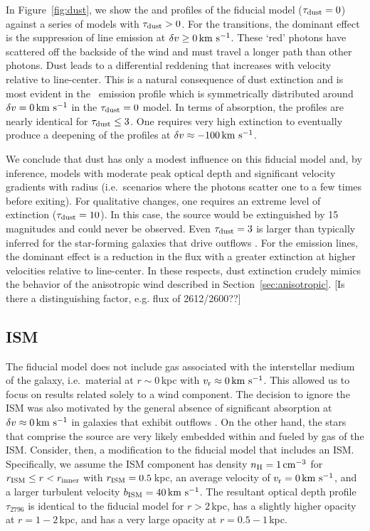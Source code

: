 \documentclass[12pt,preprint]{aastex}
\begin{document}
In Figure~\ref{fig:dust}, we show the  and 
profiles of the fiducial model ($\tau_{\rm dust} = 0$) against a series of
models with $\tau_{\rm dust} > 0$.  For the  transitions, the
dominant effect is the suppression of line emission at $\delta v \ge 0
\, {\rm km~s^{-1}}$.  These `red' photons have scattered off the
backside of the wind and must travel a longer path than other
photons.  Dust leads to a differential reddening that increases with 
velocity relative to line-center. This is a natural consequence of dust
extinction and is most evident in the \feiic\ 
emission profile which is symmetrically distributed around
$\delta v= 0 \, {\rm km~s^{-1}}$ in the $\tau_{\rm dust}=0$ model.   In terms of absorption, the profiles are
nearly identical for $\tau_{\rm dust} \le 3$.  One requires very high
extinction to eventually produce a deepening of the profiles at 
$\delta v \approx -100 \, {\rm km~s^{-1}}$.

We conclude that dust has only a modest influence on this fiducial model and,
by inference, models with moderate peak optical depth and
significant velocity gradients with radius (i.e.\ scenarios where the
photons scatter one to a few times before exiting).
For qualitative changes, one requires an extreme level of
extinction ($\tau_{\rm dust} = 10$).  In this case, the source would be
extinguished by 15\,magnitudes and could never be observed. 
Even $\tau_{\rm dust} = 3$ is larger than typically inferred for the
star-forming galaxies that drive outflows \citep[e.g.][]{dust}.
For the emission lines,
the dominant effect is a reduction in the flux 
with a greater extinction at higher velocities relative to line-center.
In these respects, dust extinction crudely mimics the behavior of the
anisotropic
wind described in Section~\ref{sec:anisotropic}. [Is there a
distinguishing factor, e.g. flux of 2612/2600??]


\subsection{ISM}
\label{sec:ISM}

The fiducial model does not include gas associated with
the interstellar medium of the galaxy, i.e.\ material at $r \sim
0$\,kpc with $v_{\rm r} \approx 0 \, {\rm km~s^{-1}}$.  This allowed us to focus on
results related solely to a wind component.  The decision to ignore the ISM
was also motivated by the general absence of significant absorption at
$\delta v \approx 0 \, {\rm km~s^{-1}}$ in galaxies that exhibit outflows 
\citep[e.g.][]{wcp+09,rubin09,steidel+10}.
On the other hand, the stars that comprise the
source are very likely embedded within and fueled by gas
of the ISM.  
Consider, then, a modification to the fiducial model that 
includes an ISM. 
Specifically, we assume the ISM component has density $n_{\rm H} = 1 \, {\rm cm^{-3}}$ for
$r_{\rm ISM} \le r < r_{\rm inner}$ with $r_{\rm ISM} = 0.5$\,kpc, 
an average velocity of $v_{\rm r} = 0 \, {\rm km~s^{-1}}$, and a larger turbulent velocity $b_{\rm ISM} = 40 \, {\rm km~s^{-1}}$.
The resultant optical depth profile $\tau_{2796}$ is identical to the
fiducial model for $r > 2$\,kpc, has a slightly higher opacity at
$r=1-2$\,kpc, and has a very large opacity at $r = 0.5-1$\,kpc.
\end{document}

